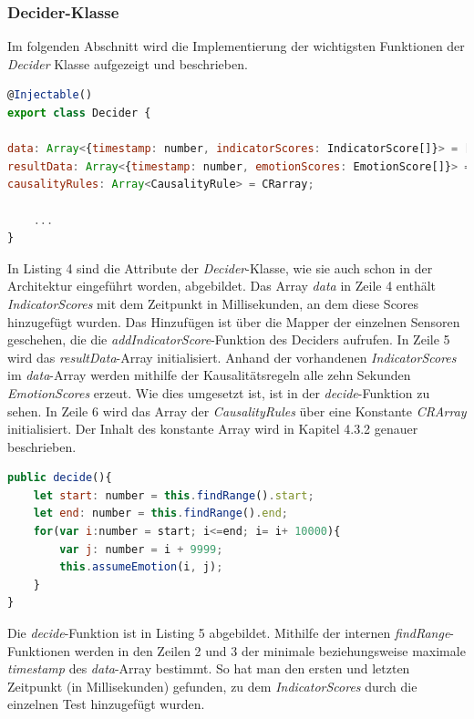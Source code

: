 \subsubsection{Decider-Klasse}
Im folgenden Abschnitt wird die Implementierung der wichtigsten Funktionen der \textit{Decider} Klasse aufgezeigt und beschrieben. \newline
\begin{lstlisting}[caption={Atrribute der Decider-Klasse}, language=JavaScript]
@Injectable()
export class Decider {

data: Array<{timestamp: number, indicatorScores: IndicatorScore[]}> = [];
resultData: Array<{timestamp: number, emotionScores: EmotionScore[]}> = [];
causalityRules: Array<CausalityRule> = CRarray;

	...
}
\end{lstlisting}
In Listing 4 sind die Attribute der \textit{Decider}-Klasse, wie sie auch schon in der Architektur eingeführt worden, abgebildet. Das Array \textit{data} in Zeile 4 enthält \textit{IndicatorScores} mit dem Zeitpunkt in Millisekunden, an dem diese Scores hinzugefügt wurden. Das Hinzufügen ist über die Mapper der einzelnen Sensoren geschehen, die die \textit{addIndicatorScore}-Funktion des Deciders aufrufen.\newline
In Zeile 5 wird das \textit{resultData}-Array initialisiert. Anhand der vorhandenen \textit{IndicatorScores} im \textit{data}-Array werden mithilfe der Kausalitätsregeln alle zehn Sekunden \textit{EmotionScores} erzeut. Wie dies umgesetzt ist, ist in der \textit{decide}-Funktion zu sehen. \newline
In Zeile 6 wird das Array der \textit{CausalityRules} über eine Konstante \textit{CRArray} initialisiert. Der Inhalt des konstante Array wird in Kapitel 4.3.2 genauer beschrieben. \newline
\begin{lstlisting}[caption={decide-Funktion der Decider-Klasse}, language=JavaScript]
public decide(){
	let start: number = this.findRange().start;
	let end: number = this.findRange().end;
	for(var i:number = start; i<=end; i= i+ 10000){
		var j: number = i + 9999;
		this.assumeEmotion(i, j);
	} 
}
\end{lstlisting}
Die \textit{decide}-Funktion ist in Listing 5 abgebildet. Mithilfe der internen \textit{findRange}-Funktionen werden in den Zeilen 2 und 3 der minimale beziehungsweise maximale \textit{timestamp} des \textit{data}-Array bestimmt. So hat man den ersten und letzten Zeitpunkt (in Millisekunden) gefunden, zu dem \textit{IndicatorScores} durch die einzelnen Test hinzugefügt wurden. \newline
